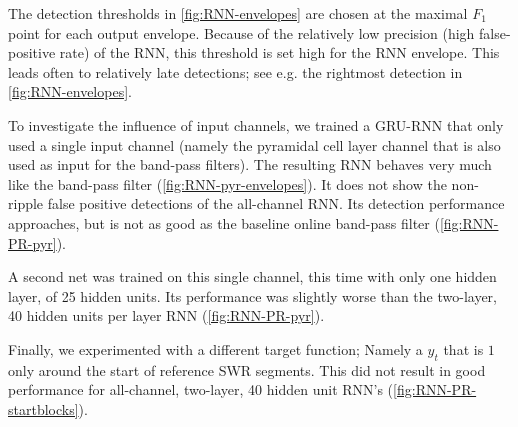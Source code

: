 The detection thresholds in \cref{fig:RNN-envelopes} are chosen at the maximal $F_1$ point for each output envelope. Because of the relatively low precision (high false-positive rate) of the RNN, this threshold is set high for the RNN envelope. This leads often to relatively late detections; see e.g. the rightmost detection in \cref{fig:RNN-envelopes}.

To investigate the influence of input channels, we trained a GRU-RNN that only used a single input channel (namely the pyramidal cell layer channel that is also used as input for the band-pass filters). The resulting RNN behaves very much like the band-pass filter (\cref{fig:RNN-pyr-envelopes}). It does not show the non-ripple false positive detections of the all-channel RNN. Its detection performance approaches, but is not as good as the baseline online band-pass filter (\cref{fig:RNN-PR-pyr}).

A second net was trained on this single channel, this time with only one hidden layer, of 25 hidden units. Its performance was slightly worse than the two-layer, 40 hidden units per layer RNN (\cref{fig:RNN-PR-pyr}).

Finally, we experimented with a different target function; Namely a $y_t$ that is $1$ only around the start of reference SWR segments. This did not result in good performance for all-channel, two-layer, 40 hidden unit RNN's (\cref{fig:RNN-PR-startblocks}).
